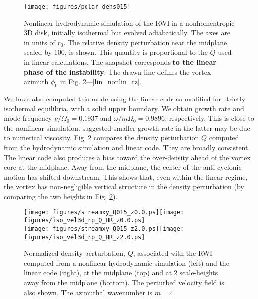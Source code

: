 \begin{figure}[!t]
  \centering
  \texttt{[image: figures/polar\_dens015]}
  \caption{Nonlinear hydrodynamic simulation of the RWI in a
    nonhomentropic 3D disk, initially isothermal but
    evolved adiabatically. The axes are in units of $r_0$. The relative density perturbation 
    near the midplane, scaled by 100, is shown. This quantity is
    proportional to the $Q$ used in linear calculations. The snapshot
    corresponds {\bf to the linear phase of the instability}. The drawn line   
    defines the vortex azimuth $\phi_0$ in Fig. \ref{lin_nonlin}---\ref{lin_nonlin_rz}.
    \label{hydro_polar_dens}}
\end{figure}

We have also computed this mode using the linear code as modified for
strictly isothermal equilibria, with a solid upper boundary. We obtain
growth rate and mode frequency $\nu/\Omega_0 = 0.1937$ and $\omega/m\Omega_0 = 
0.9896$, respectively. This is close to the nonlinear simulation. \cite{meheut12} suggested
smaller growth rate in the latter may be due to numerical viscosity. 
Fig. \ref{lin_nonlin} compares the density
perturbation $Q$ computed from the hydrodynamic simulation and linear code. They are broadly
consistent. The linear code also produces a bias toward the
over-density ahead of the vortex core at the midplane. Away from the
midplane, the center of the anti-cyclonic motion has shifted
downstream. 
This shows that, even within the linear regime, the vortex has
non-negligible vertical structure in the density perturbation (by comparing the two heights in Fig. \ref{lin_nonlin}). 

\begin{figure}[!t]
  \centering
  \texttt{[image: figures/streamxy\_Q015\_z0.0.ps]}\texttt{[image: figures/iso\_vel3d\_rp\_Q\_HR\_z0.0.ps]}\\
  \texttt{[image: figures/streamxy\_Q015\_z2.0.ps]}\texttt{[image: figures/iso\_vel3d\_rp\_Q\_HR\_z2.0.ps]}
  \caption{Normalized density perturbation, $Q$, associated with the
    RWI computed from a nonlinear hydrodynamic simulation (left) and
    the linear code (right), at the midplane (top) and at $2$
    scale-heights away from the midplane (bottom). The perturbed
    velocity field is also shown. The azimuthal wavenumber is $m=4$.  
  \label{lin_nonlin}}
\end{figure}

